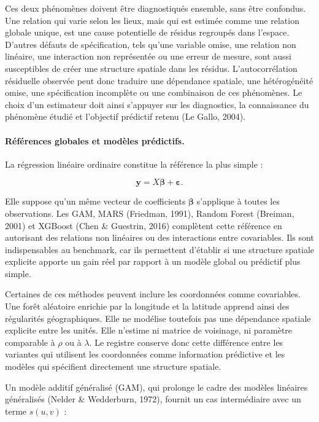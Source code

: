 \documentclass[11pt,a4paper]{article}
\begin{document}
Ces deux phénomènes doivent être diagnostiqués ensemble, sans être confondus. Une relation qui varie selon les lieux, mais qui est estimée comme une relation globale unique, est une cause potentielle de résidus regroupés dans l'espace. D'autres défauts de spécification, tels qu'une variable omise, une relation non linéaire, une interaction non représentée ou une erreur de mesure, sont aussi susceptibles de créer une structure spatiale dans les résidus. L'autocorrélation résiduelle observée peut donc traduire une dépendance spatiale, une hétérogénéité omise, une spécification incomplète ou une combinaison de ces phénomènes. Le choix d'un estimateur doit ainsi s'appuyer sur les diagnostics, la connaissance du phénomène étudié et l'objectif prédictif retenu (Le Gallo, 2004).

\paragraph{Références globales et modèles prédictifs.}

La régression linéaire ordinaire constitue la référence la plus simple :

\begin{equation}
    \mathbf{y}=X\boldsymbol{\beta}+\boldsymbol{\varepsilon}.
\end{equation}

Elle suppose qu'un même vecteur de coefficients $\boldsymbol{\beta}$ s'applique à toutes les observations. Les GAM, MARS (Friedman, 1991), Random Forest (Breiman, 2001) et XGBoost (Chen \& Guestrin, 2016) complètent cette référence en autorisant des relations non linéaires ou des interactions entre covariables. Ils sont indispensables au benchmark, car ils permettent d'établir si une structure spatiale explicite apporte un gain réel par rapport à un modèle global ou prédictif plus simple.

Certaines de ces méthodes peuvent inclure les coordonnées comme covariables. Une forêt aléatoire enrichie par la longitude et la latitude apprend ainsi des régularités géographiques. Elle ne modélise toutefois pas une dépendance spatiale explicite entre les unités. Elle n'estime ni matrice de voisinage, ni paramètre comparable à $\rho$ ou à $\lambda$. Le registre conserve donc cette différence entre les variantes qui utilisent les coordonnées comme information prédictive et les modèles qui spécifient directement une structure spatiale.

Un modèle additif généralisé (GAM), qui prolonge le cadre des modèles linéaires généralisés (Nelder \& Wedderburn, 1972), fournit un cas intermédiaire avec un terme $s(u,v)$ :
\end{document}

